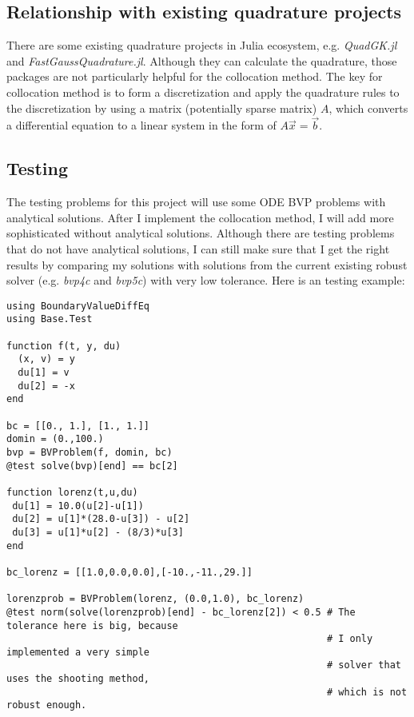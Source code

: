 \documentclass[a4paper,11pt,onecolumn]{article}
\begin{document}
\subsection{Relationship with existing quadrature projects} %
\label{sub:relation_with_existing_quadrature}
There are some existing quadrature projects in Julia ecosystem, e.g. \textit{QuadGK.jl} and
\textit{FastGaussQuadrature.jl}. Although they can calculate the quadrature, those packages
are not particularly helpful for the collocation method. The key for collocation method is to
form a discretization and apply the quadrature rules to the discretization by using a matrix
(potentially sparse matrix) $A$, which converts a differential equation to a linear system in
the form of $A\vec{x}=\vec{b}$.

\subsection{Testing} %
\label{sub:testing}
The testing problems for this project will use some ODE BVP problems with analytical solutions.
After I implement the collocation method, I will add more sophisticated without analytical
solutions. Although there are testing problems that do not have analytical solutions, I can
still make sure that I get the right results by comparing my solutions with solutions from
the current existing robust solver (e.g. \textit{bvp4c} and \textit{bvp5c}) with very low
tolerance. Here is an testing example:

\begin{lstlisting}[mathescape=true]
using BoundaryValueDiffEq
using Base.Test

function f(t, y, du)
  (x, v) = y
  du[1] = v
  du[2] = -x
end

bc = [[0., 1.], [1., 1.]]
domin = (0.,100.)
bvp = BVProblem(f, domin, bc)
@test solve(bvp)[end] == bc[2]

function lorenz(t,u,du)
 du[1] = 10.0(u[2]-u[1])
 du[2] = u[1]*(28.0-u[3]) - u[2]
 du[3] = u[1]*u[2] - (8/3)*u[3]
end

bc_lorenz = [[1.0,0.0,0.0],[-10.,-11.,29.]]

lorenzprob = BVProblem(lorenz, (0.0,1.0), bc_lorenz)
@test norm(solve(lorenzprob)[end] - bc_lorenz[2]) < 0.5 # The tolerance here is big, because
														# I only implemented a very simple
														# solver that uses the shooting method,
														# which is not robust enough.
\end{lstlisting}
\end{document}
